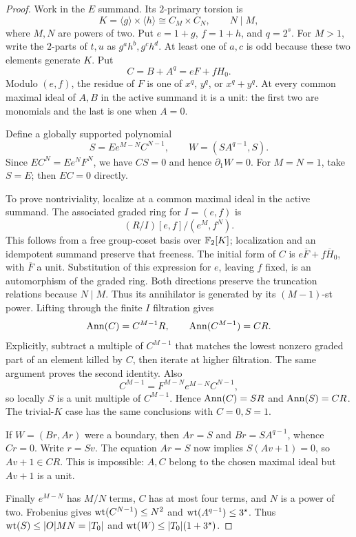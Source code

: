 \begin{proof}
Work in the $E$ summand. Its $2$-primary torsion is
\[
 K=\langle g\rangle\times\langle h\rangle\cong C_M\times C_N,
 \qquad N\mid M,
\]
where $M,N$ are powers of two. Put $e=1+g$, $f=1+h$, and $q=2^s$. For $M>1$, write the $2$-parts of $t,u$ as $g^a h^b,g^c h^d$. At least one of $a,c$ is odd because these two elements generate $K$. Put
\[
 C=B+A^q=eF+fH_0.
\]
Modulo $(e,f)$, the residue of $F$ is one of $x^q$, $y^q$, or $x^q+y^q$. At every common maximal ideal of $A,B$ in the active summand it is a unit: the first two are monomials and the last is one when $A=0$.

Define a globally supported polynomial
\begin{equation}\label{eq:S-witness}
 S=E e^{M-N}C^{N-1},\qquad W=(SA^{q-1},S).
\end{equation}
Since $EC^N=Ee^NF^N$, we have $CS=0$ and hence $\partial_1W=0$. For $M=N=1$, take $S=E$; then $EC=0$ directly.

To prove nontriviality, localize at a common maximal ideal in the active summand. The associated graded ring for $I=(e,f)$ is
\[
 (R/I)[e,f]/(e^M,f^N).
\]
This follows from a free group-coset basis over $\mathbb F_2[K]$; localization and an idempotent summand preserve that freeness. The initial form of $C$ is $e\overline F+f\overline H_0$, with $\overline F$ a unit. Substitution of this expression for $e$, leaving $f$ fixed, is an automorphism of the graded ring. Both directions preserve the truncation relations because $N\mid M$. Thus its annihilator is generated by its $(M-1)$-st power. Lifting through the finite $I$ filtration gives
\[
 \operatorname{Ann}(C)=C^{M-1}R,\qquad \operatorname{Ann}(C^{M-1})=CR.
\]
Explicitly, subtract a multiple of $C^{M-1}$ that matches the lowest nonzero graded part of an element killed by $C$, then iterate at higher filtration. The same argument proves the second identity. Also
\[
 C^{M-1}=F^{M-N} e^{M-N}C^{N-1},
\]
so locally $S$ is a unit multiple of $C^{M-1}$. Hence $\operatorname{Ann}(C)=SR$ and $\operatorname{Ann}(S)=CR$. The trivial-$K$ case has the same conclusions with $C=0,S=1$.

If $W=(Br,Ar)$ were a boundary, then $Ar=S$ and $Br=SA^{q-1}$, whence $Cr=0$. Write $r=Sv$. The equation $Ar=S$ now implies $S(Av+1)=0$, so $Av+1\in CR$. This is impossible: $A,C$ belong to the chosen maximal ideal but $Av+1$ is a unit.

Finally $e^{M-N}$ has $M/N$ terms, $C$ has at most four terms, and $N$ is a power of two. Frobenius gives $\operatorname{wt}(C^{N-1})\le N^2$ and $\operatorname{wt}(A^{q-1})\le3^s$. Thus $\operatorname{wt}(S)\le|O|MN=|T_0|$ and $\operatorname{wt}(W)\le|T_0|(1+3^s)$.
\end{proof}


